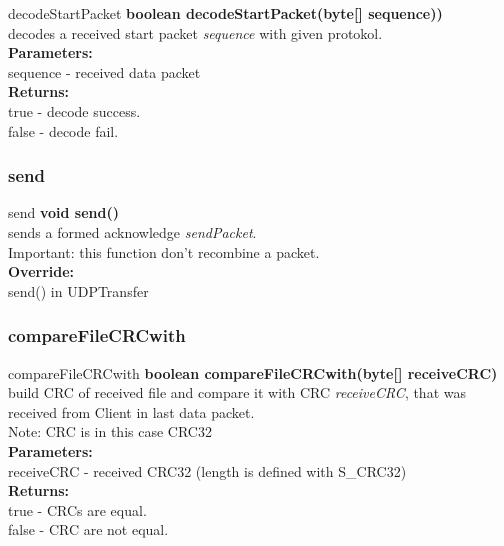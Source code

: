 \documentclass[12pt]{article}
\begin{document}
\begin{mybox}[colback=white]{decodeStartPacket}
\textbf{boolean decodeStartPacket(byte[] sequence))} \\
decodes a received start packet \textit{sequence} with given protokol. \\
\textbf{Parameters:} \\
sequence - received data packet \\
\textbf{Returns:} \\
true - decode success. \\
false - decode fail.
\end{mybox}

\subsubsection{send}
\begin{mybox}[colback=white]{send}
\textbf{void send()} \\
sends a formed acknowledge \textit{sendPacket}. \\
Important: this function don't recombine a packet.\\
\textbf{Override:} \\
send() in UDPTransfer \\
\end{mybox}

\subsubsection{compareFileCRCwith}
\begin{mybox}[colback=white]{compareFileCRCwith}
\textbf{boolean compareFileCRCwith(byte[] receiveCRC)} \\
build CRC of received file and compare it with CRC \textit{receiveCRC},
that was received from Client in last data packet. \\
Note: CRC is in this case CRC32 
\\
\textbf{Parameters:} \\
receiveCRC - received CRC32 (length is defined with S\_CRC32) \\
\textbf{Returns:} \\
true - CRCs are equal. \\
false - CRC are not equal.
\end{mybox}
\end{document}
